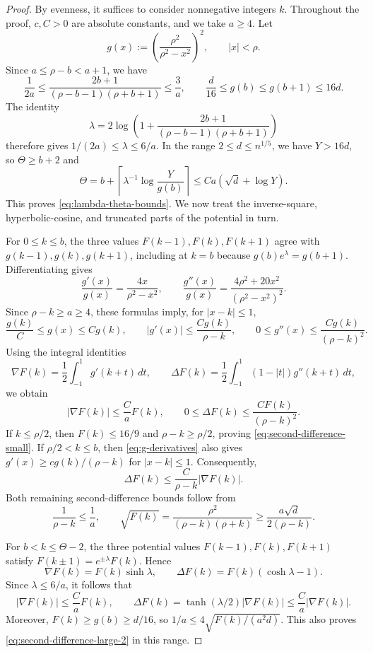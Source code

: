\documentclass[10pt,a4paper]{amsart}
\begin{document}
\begin{proof}
By evenness, it suffices to consider nonnegative integers $k$.
Throughout the proof, $c,C>0$ are absolute constants, and we take $a\ge4$.
Let
\[
    g(x):=\left(\frac{\rho^2}{\rho^2-x^2}\right)^2,
    \qquad |x|<\rho.
\]
Since $a\le\rho-b<a+1$, we have
\[
 \frac{1}{2a}
 \le\frac{2b+1}{(\rho-b-1)(\rho+b+1)}
 \le\frac{3}{a},
 \qquad
 \frac{d}{16}\le g(b)\le g(b+1)\le16d.
\]
The identity
\[
 \lambda=2\log\left(1+
   \frac{2b+1}{(\rho-b-1)(\rho+b+1)}\right)
\]
therefore gives $1/(2a)\le\lambda\le6/a$.
In the range $2\le d\le {n^{1/5}}$, we have $Y>16d$, so
$\Theta\ge b+2$ and
\[
 \Theta=b+\left\lceil\lambda^{-1}\log\frac{Y}{g(b)}\right\rceil
 \le Ca(\sqrt d+\log Y).
\]
This proves \eqref{eq:lambda-theta-bounds}. We now treat the inverse-square,
{\color{black}hyperbolic-cosine}, and truncated parts of the potential in turn.

For $0\le k\le b$, the three values $F(k-1),F(k),F(k+1)$ agree with
$g(k-1),g(k),g(k+1)$, including at $k=b$ because
$g(b)e^\lambda=g(b+1)$. Differentiating gives
\begin{equation}\label{eq:g-derivatives}
 \frac{g'(x)}{g(x)}=\frac{4x}{\rho^2-x^2},
 \qquad
 \frac{g''(x)}{g(x)}
   =\frac{4\rho^2+20x^2}{(\rho^2-x^2)^2}.
\end{equation}
Since $\rho-k\ge a\ge4$, these formulas imply, for $|x-k|\le1$,
\begin{equation}\label{eq:g-local-bounds}
 \frac{g(k)}{C}\le g(x)\le Cg(k),\qquad
 |g'(x)|\le\frac{Cg(k)}{\rho-k},\qquad
 0\le g''(x)\le\frac{Cg(k)}{(\rho-k)^2}.
\end{equation}
Using the integral identities
\[
 \nabla F(k)=\frac12\int_{-1}^{1}g'(k+t)\,dt,
 \qquad
 \Delta F(k)=\frac12\int_{-1}^{1}(1-|t|)g''(k+t)\,dt,
\]
we obtain
\[
 |\nabla F(k)|\le\frac{C}{a}F(k),
 \qquad
 0\le\Delta F(k)\le\frac{CF(k)}{(\rho-k)^2}.
\]
If $k\le\rho/2$, then $F(k)\le16/9$ and $\rho-k\ge\rho/2$, proving
\eqref{eq:second-difference-small}. If $\rho/2<k\le b$, then
\eqref{eq:g-derivatives} also gives
$g'(x)\ge cg(k)/(\rho-k)$ for $|x-k|\le1$. Consequently,
\[
 \Delta F(k)\le\frac{C}{\rho-k}|\nabla F(k)|.
\]
Both remaining second-difference bounds follow from
\[
 \frac{1}{\rho-k}\le\frac1a,
 \qquad
 \sqrt{F(k)}=\frac{\rho^2}{(\rho-k)(\rho+k)}
 \ge\frac{a\sqrt d}{2(\rho-k)}.
\]

For $b<k\le\Theta-2$, {\color{black}the three potential values $F(k-1),F(k),F(k+1)$ satisfy $F(k\pm1)=e^{\pm\lambda}F(k)$.} Hence
\[
 \nabla F(k)=F(k)\sinh\lambda,
 \qquad
 \Delta F(k)=F(k)(\cosh\lambda-1).
\]
Since $\lambda\le6/a$, it follows that
\[
 |\nabla F(k)|\le\frac{C}{a}F(k),
 \qquad
 \Delta F(k)=\tanh(\lambda/2)|\nabla F(k)|
 \le\frac{C}{a}|\nabla F(k)|.
\]
Moreover, $F(k)\ge g(b)\ge d/16$, so
$1/a\le4\sqrt{F(k)/(a^2d)}$. This also proves
\eqref{eq:second-difference-large-2} in this range.



\end{proof}
\end{document}
